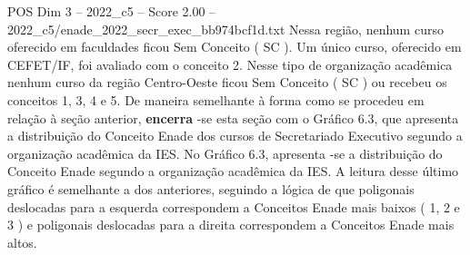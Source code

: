 \begin{textsample}{POS Dim 3 – 2022\_c5 – Score 2.00 – 2022\_c5/enade\_2022\_secr\_exec\_bb974bcf1d.txt}
Nessa região, nenhum curso oferecido em faculdades ficou Sem Conceito ( SC ).
Um único curso, oferecido em CEFET/IF, foi avaliado com o conceito 2.
Nesse tipo de organização acadêmica nenhum curso da região Centro-Oeste ficou Sem Conceito ( SC ) ou recebeu os conceitos 1, 3, 4 e 5.
De maneira semelhante à forma como se procedeu em relação à seção anterior, \textbf{encerra} -se esta seção com o Gráfico 6.3, que apresenta a distribuição do Conceito Enade dos cursos de Secretariado Executivo segundo a organização acadêmica da IES.
No Gráfico 6.3, apresenta -se a distribuição do Conceito Enade segundo a organização acadêmica da IES.
A leitura desse último gráfico é semelhante a dos anteriores, seguindo a lógica de que poligonais deslocadas para a esquerda correspondem a Conceitos Enade mais baixos ( 1, 2 e 3 ) e poligonais deslocadas para a direita correspondem a Conceitos Enade mais altos.

\end{textsample}

